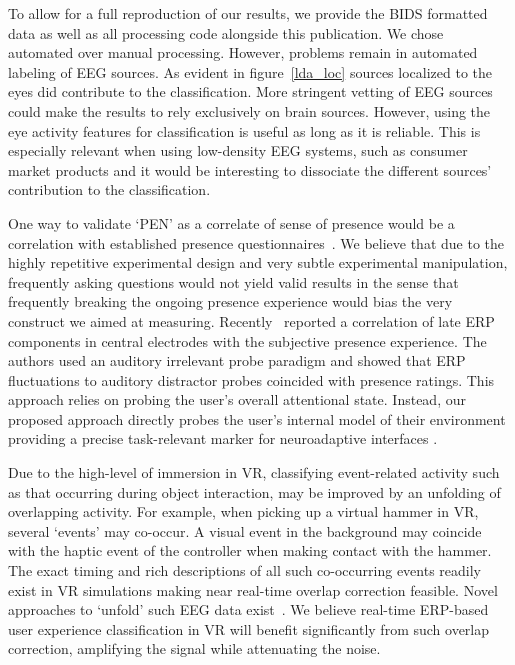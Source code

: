 To allow for a full reproduction of our results, we provide the BIDS formatted data as well as all processing code alongside this publication. We chose automated over manual processing. However, problems remain in automated labeling of EEG sources. As evident in figure~\ref{lda_loc} sources localized to the eyes did contribute to the classification. More stringent vetting of EEG sources could make the results to rely exclusively on brain sources. However, using the eye activity features for classification is useful as long as it is reliable. This is especially relevant when using low-density EEG systems, such as consumer market products and it would be interesting to dissociate the different sources' contribution to the classification.

One way to validate `PEN' as a correlate of sense of presence would be a correlation with established presence questionnaires~\cite{Witmer1998-ew,Schubert2003-sq}. We believe that due to the highly repetitive experimental design and very subtle experimental manipulation, frequently asking questions would not yield valid results in the sense that frequently breaking the ongoing presence experience would bias the very construct we aimed at measuring. Recently~\cite{Grassini2021-tc} reported a correlation of late ERP components in central electrodes with the subjective presence experience. The authors used an auditory irrelevant probe paradigm and showed that ERP fluctuations to auditory distractor probes coincided with presence ratings. This approach relies on probing the user's overall attentional state. Instead, our proposed approach directly probes the user's internal model of their environment providing a precise task-relevant marker for neuroadaptive interfaces \cite{Krol2020-lj}.

Due to the high-level of immersion in VR, classifying event-related activity such as that occurring during object interaction, may be improved by an unfolding of overlapping activity. For example, when picking up a virtual hammer in VR, several `events' may co-occur. A visual event in the background may coincide with the haptic event of the controller when making contact with the hammer. The exact timing and rich descriptions of all such co-occurring events readily exist in VR simulations making near real-time overlap correction feasible. Novel approaches to `unfold' such EEG data exist~\cite{Ehinger2019-in}. We believe real-time ERP-based user experience classification in VR will benefit significantly from such overlap correction, amplifying the signal while attenuating the noise.

